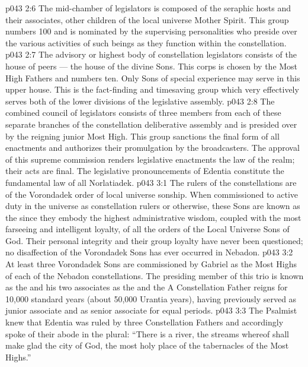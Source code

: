 \vs p043 2:6 The mid\hyp{}chamber of legislators is composed of the seraphic hosts and their associates, other children of the local universe Mother Spirit. This group numbers 100 and is nominated by the supervising personalities who preside over the various activities of such beings as they function within the constellation.
\vs p043 2:7 The advisory or highest body of constellation legislators consists of the house of peers --- the house of the divine Sons. This corps is chosen by the Most High Fathers and numbers ten. Only Sons of special experience may serve in this upper house. This is the fact\hyp{}finding and timesaving group which very effectively serves both of the lower divisions of the legislative assembly.
\vs p043 2:8 The combined council of legislators consists of three members from each of these separate branches of the constellation deliberative assembly and is presided over by the reigning junior Most High. This group sanctions the final form of all enactments and authorizes their promulgation by the broadcasters. The approval of this supreme commission renders legislative enactments the law of the realm; their acts are final. The legislative pronouncements of Edentia constitute the fundamental law of all Norlatiadek.
\vs p043 3:1 The rulers of the constellations are of the Vorondadek order of local universe sonship. When commissioned to active duty in the universe as constellation rulers or otherwise, these Sons are known as the  since they embody the highest administrative wisdom, coupled with the most farseeing and intelligent loyalty, of all the orders of the Local Universe Sons of God. Their personal integrity and their group loyalty have never been questioned; no disaffection of the Vorondadek Sons has ever occurred in Nebadon.
\vs p043 3:2 \pc At least three Vorondadek Sons are commissioned by Gabriel as the Most Highs of each of the Nebadon constellations. The presiding member of this trio is known as the  and his two associates as the  and the  A Constellation Father reigns for 10,000 standard years (about 50,000 Urantia years), having previously served as junior associate and as senior associate for equal periods.
\vs p043 3:3 The Psalmist knew that Edentia was ruled by three Constellation Fathers and accordingly spoke of their abode in the plural: “There is a river, the streams whereof shall make glad the city of God, the most holy place of the tabernacles of the Most Highs.”

